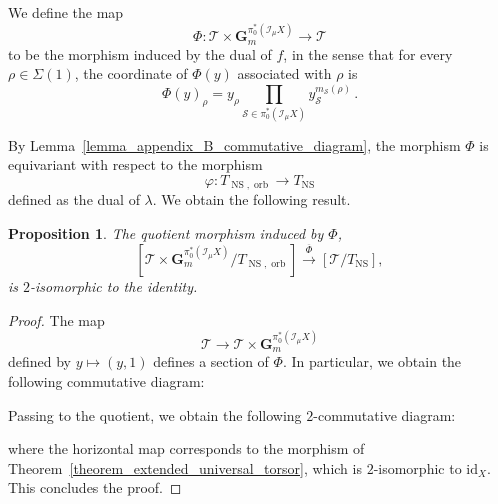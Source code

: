\documentclass{proc-l}
\newcommand{\G}{\mathbf{G}}
\DeclareMathOperator{\NS}{NS}
\DeclareMathOperator{\orb}{orb}
\newcommand{\stackS}{\mathcal{S}}
\newcommand{\stackT}{\mathcal{T}}
\newcommand{\sheafI}{\mathcal{I}}
\newcommand{\twistsector}{\pi_0^*(\sheafI_{\mu} X)}
\newtheorem{prop}[theorem]{Proposition}
\theoremstyle{definition}
\theoremstyle{remark}
\numberwithin{equation}{section}
\begin{document}
We define the map
$$
\Phi : \stackT \times \G_m^{\twistsector} \longrightarrow \stackT
$$
to be the morphism induced by the dual of $f$, in the sense that for every $\rho \in \Sigma(1)$, the coordinate of $\Phi(y)$ associated with $\rho$ is
\begin{equation}\label{equation_definition_retraction_appendix_B}
\Phi(y)_{\rho}
=
y_{\rho}
\prod\limits_{\stackS \in \twistsector}
y_{\stackS}^{m_{\stackS}(\rho)} \, .
\end{equation}

By Lemma~\ref{lemma_appendix_B_commutative_diagram}, the morphism $\Phi$ is equivariant with respect to the morphism
$$
\varphi : T_{\NS,\orb} \longrightarrow T_{\NS}
$$
defined as the dual of $\lambda$. We obtain the following result.

\begin{prop}\label{prop_appendix_B_retraction_torsion_free_case}
The quotient morphism induced by $\Phi$,
$$
[\stackT \times \G_m^{\twistsector} / T_{\NS,\orb}]
\xrightarrow{\overline \Phi}
[\stackT / T_{\NS}],
$$
is $2$-isomorphic to the identity.
\end{prop}

\begin{proof}
The map
$$
\stackT \longrightarrow \stackT \times \G_m^{\twistsector}
$$
defined by $y \mapsto (y,1)$ defines a section of $\Phi$. In particular, we obtain the following commutative diagram:
\begin{center}
\end{center}

Passing to the quotient, we obtain the following $2$-commutative diagram:
\begin{center}
\end{center}where the horizontal map corresponds to the morphism of Theorem~\ref{theorem_extended_universal_torsor}, which is $2$-isomorphic to $\mathrm{id}_{X}$. This concludes the proof.
\end{proof}
\end{document}
